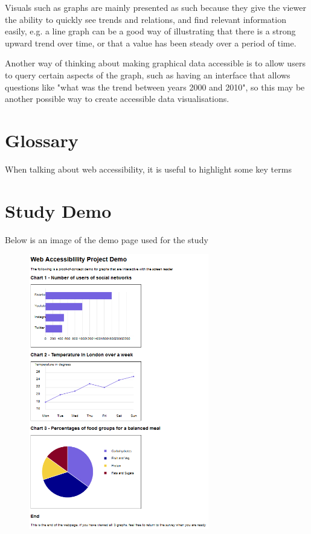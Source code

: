 \documentclass[ %
                    author={Aleena Baig},
                supervisor={Dr Simon Lock},
                    degree={BSc},
                     title={On Making Web Accessible Graphs},
                  subtitle={},
                      year={2019} ]{dissertation}
\begin{document}
Visuals such as graphs are mainly presented as such because they give the viewer the ability to quickly see trends and relations, and find relevant information easily, e.g. a line graph can be a good way of illustrating that there is a strong upward trend over time, or that a value has been steady over a period of time.

Another way of thinking about making graphical data accessible is to allow users to query certain aspects of the graph, such as having an interface that allows questions like "what was the trend between years 2000 and 2010", so this may be another possible way to create accessible data visualisations.


\chapter{Glossary}

When talking about web accessibility, it is useful to highlight some key terms

\BlankLine
%
\glsaddall
\printglossary[nonumberlist]

\appendix
\chapter{Study Demo}
\label{appendix:studydemo}

Below is an image of the demo page used for the study

\begin{figure}[h]
\includegraphics[width=0.7\textwidth]{images/Demo.PNG}
\end{figure}
\end{document}
